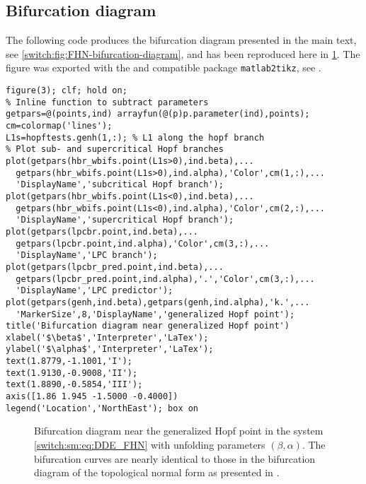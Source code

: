 \subsection{Bifurcation diagram}
The following code produces the bifurcation diagram presented in the main text, see \cref{switch:fig:FHN-bifurcation-diagram}, and has been reproduced here in \cref{switch:sm:fig:FHN-bifurcation-diagram}. The figure was exported with the \MATLAB and \OCTAVE compatible package {\tt matlab2tikz}, see \cite{matlab2tikz}. 
\begin{lstlisting}[style=customMatlab,caption=\MATLAB code for bifurcation diagram, label={sm:lst:bifurcation_diagram}]
%% Bifurcation diagram
figure(3); clf; hold on;
% Inline function to subtract parameters
getpars=@(points,ind) arrayfun(@(p)p.parameter(ind),points);
cm=colormap('lines');
L1s=hopftests.genh(1,:); % L1 along the hopf branch
% Plot sub- and supercritical Hopf branches
plot(getpars(hbr_wbifs.point(L1s>0),ind.beta),...
  getpars(hbr_wbifs.point(L1s>0),ind.alpha),'Color',cm(1,:),...
  'DisplayName','subcritical Hopf branch');
plot(getpars(hbr_wbifs.point(L1s<0),ind.beta),...
  getpars(hbr_wbifs.point(L1s<0),ind.alpha),'Color',cm(2,:),...
  'DisplayName','supercritical Hopf branch');
plot(getpars(lpcbr.point,ind.beta),...
  getpars(lpcbr.point,ind.alpha),'Color',cm(3,:),...
  'DisplayName','LPC branch');
plot(getpars(lpcbr_pred.point,ind.beta),...
  getpars(lpcbr_pred.point,ind.alpha),'.','Color',cm(3,:),...
  'DisplayName','LPC predictor');
plot(getpars(genh,ind.beta),getpars(genh,ind.alpha),'k.',...
  'MarkerSize',8,'DisplayName','generalized Hopf point');
title('Bifurcation diagram near generalized Hopf point')
xlabel('$\beta$','Interpreter','LaTex');
ylabel('$\alpha$','Interpreter','LaTex');
text(1.8779,-1.1001,'I');
text(1.9130,-0.9008,'II');
text(1.8890,-0.5854,'III');
axis([1.86 1.945 -1.5000 -0.4000])
legend('Location','NorthEast'); box on 
\end{lstlisting}
%
\begin{figure}[ht]
\centering
{}
\caption{Bifurcation diagram near the generalized
Hopf point in the system \cref{switch:sm:eq:DDE_FHN} with unfolding parameters
$(\beta,\alpha)$. The bifurcation curves are nearly identical to
those in the bifurcation diagram of the topological normal form as
presented in \textup{\cite[page 314]{Kuznetsov2004}}.}
\label{switch:sm:fig:FHN-bifurcation-diagram}
\end{figure}

